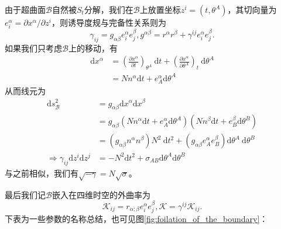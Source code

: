\documentclass[hyperref, UTF8, a4paper]{ctexart}
\begin{document}
由于超曲面$\mathscr{B}$自然被$S_{t}$分解，我们在$\mathscr{B}$上放置坐标$z^{i} =(t,\theta ^{A} )$，其切向量为$e_{i}^{\alpha } =\partial x^{\alpha } /\partial z^{i}$，则诱导度规与完备性关系则为
\begin{equation*}
	\gamma _{ij} =g_{\alpha \beta } e_{i}^{\alpha } e_{j}^{\beta } ,g^{\alpha \beta } =r^{\alpha } r^{\beta } +\gamma ^{ij} e_{i}^{\alpha } e_{j}^{\beta } .
\end{equation*}
如果我们只考虑$\mathscr{B}$上的移动，有
\begin{equation*}
	\begin{aligned}
		\mathrm{d} x^{\alpha } & =\left(\frac{\partial x^{\alpha }}{\partial t}\right)_{\theta ^{A}} \ \mathrm{d} t+\left(\frac{\partial x^{\alpha }}{\partial \theta ^{A}}\right)_{t}\mathrm{\ d} \theta ^{A}\\
		& =Nn^{\alpha }\mathrm{d} t+e_{A}^{\alpha }\mathrm{d} \theta ^{A}
	\end{aligned}
\end{equation*}
从而线元为
\begin{equation*}
	\begin{aligned}
		\mathrm{d} s_{\mathscr{B}}^{2} & =g_{\alpha \beta }\mathrm{d} x^{\alpha }\mathrm{d} x^{\beta }\\
		& =g_{\alpha \beta }\left( Nn^{\alpha }\mathrm{d} t+e_{A}^{\alpha }\mathrm{d} \theta ^{A}\right)\left( Nn^{\beta }\mathrm{d} t+e_{B}^{\beta }\mathrm{d} \theta ^{B}\right)\\
		& =\left( g_{\alpha \beta } n^{\alpha } n^{\beta }\right) N^{2} \ \mathrm{d} t^{2} +\left( g_{\alpha \beta } e_{A}^{\alpha } e_{B}^{\beta }\right)\mathrm{d} \theta ^{A} \ \mathrm{d} \theta ^{B}\\
		\Rightarrow \gamma _{ij}\mathrm{d} z^{i}\mathrm{d} z^{j} & =-N^{2}\mathrm{d} t^{2} +\sigma _{AB}\mathrm{d} \theta ^{A}\mathrm{d} \theta ^{B}
	\end{aligned}
\end{equation*}
与之前相似，我们有$\sqrt{-\gamma } =N\sqrt{\sigma }$。

最后我们记$\mathscr{B}$嵌入在四维时空的外曲率为
\begin{equation*}
	\mathscr{K}_{ij} =r_{\alpha ;\beta } e_{i}^{\alpha } e_{j}^{\beta } ,\mathscr{K} =\gamma ^{ij}\mathscr{K}_{ij} .
\end{equation*}
下表为一些参数的名称总结，也可见图\ref{fig:foilation_of_the_boundary}：
\end{document}
